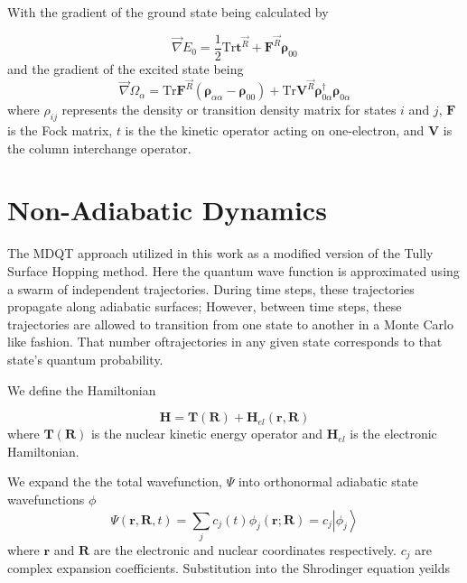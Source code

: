     With the gradient of the ground state being calculated by

    \begin{equation}
    \vec{\nabla}E_0 = \frac{1}{2} \text{Tr} \bm{t}^{\vec{R}} + \bm{F}^{\vec{R}}\bm{\rho}_{00}
    \end{equation}
    and the gradient of the excited state being 
    \begin{equation}
    \vec{\nabla}\Omega_\alpha = \text{Tr} \bm{F}^{\vec{R}} \left( \bm{\rho}_{\alpha\alpha} - \bm{\rho}_{00} \right) + \text{Tr} \bm{V}^{\vec{R}} \bm{\rho}_{0\alpha}^\dagger \bm{\rho}_{0\alpha}
    \end{equation}
    where \(\rho_{ij}\) represents the density or transition density matrix for states \(i\) and \(j\),
    \(\bm{F}\) is the Fock matrix,
    \(t\) is the the kinetic operator acting on one-electron, and \(\bm{V}\) is the column interchange operator.

\section{Non-Adiabatic Dynamics}

The MDQT approach utilized in this work as a modified version of the Tully Surface Hopping method.\cite{tully2012perspective, tully1990molecular,Tully1998}
Here the quantum wave function is approximated using a swarm of independent trajectories.
During time steps, these trajectories propagate along adiabatic surfaces;
However, between time steps, these trajectories are allowed to transition from one state to another in a Monte Carlo like fashion.
That number oftrajectories in any given state corresponds to that state's quantum probability.

We define the Hamiltonian

\begin{equation} \label{eq:tullyHamiltonian} \mathbf{H} = \mathbf{T}(\mathbf{R}) +
  \mathbf{H}_{el}(\mathbf{r},\mathbf{R})
\end{equation}
where \(\mathbf{T}(\mathbf{R}) \) is the nuclear kinetic energy operator and \(\textbf{H}_{el}\) is the electronic Hamiltonian.

We expand the the total wavefunction, \(\Psi\) into orthonormal adiabatic state wavefunctions \(\phi\)
\begin{equation}
  \Psi(\textbf{r}, \textbf{R}, t) = \sum_j c_j(t)\phi_j(\textbf{r}; \textbf{R}) = c_j \left| \phi_j \right>
\end{equation}
where \(\textbf{r}\) and \(\textbf{R}\) are the electronic and nuclear coordinates respectively.
\(c_j\) are complex expansion coefficients.
Substitution into the Shrodinger equation yeilds

